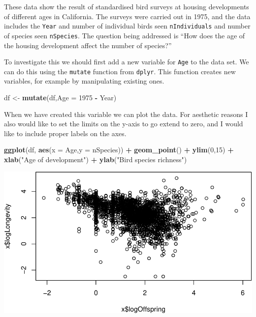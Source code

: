 \documentclass[
  a4paperpaper,
]{book}
\newenvironment{Shaded}{\begin{snugshade}}{\end{snugshade}}
\newcommand{\DataTypeTok}[1]{\textcolor[rgb]{0.13,0.29,0.53}{#1}}
\newcommand{\DecValTok}[1]{\textcolor[rgb]{0.00,0.00,0.81}{#1}}
\newcommand{\KeywordTok}[1]{\textcolor[rgb]{0.13,0.29,0.53}{\textbf{#1}}}
\newcommand{\NormalTok}[1]{#1}
\newcommand{\OperatorTok}[1]{\textcolor[rgb]{0.81,0.36,0.00}{\textbf{#1}}}
\newcommand{\StringTok}[1]{\textcolor[rgb]{0.31,0.60,0.02}{#1}}
\begin{document}
These data show the result of standardised bird surveys at housing developments of different ages in California. The surveys were carried out in 1975, and the data includes the \texttt{Year} and number of individual birds seen \texttt{nIndividuals} and number of species seen \texttt{nSpecies}. The question being addressed is ``How does the age of the housing development affect the number of species?''

To investigate this we should first add a new variable for \texttt{Age} to the data set. We can do this using the \texttt{mutate} function from \texttt{dplyr}. This function creates new variables, for example by manipulating existing ones.

\begin{Shaded}
\begin{Highlighting}[]
\NormalTok{df \textless{}{-}}\StringTok{ }\KeywordTok{mutate}\NormalTok{(df,}\DataTypeTok{Age =} \DecValTok{1975} \OperatorTok{{-}}\StringTok{ }\NormalTok{Year)}
\end{Highlighting}
\end{Shaded}

When we have created this variable we can plot the data. For aesthetic reasons I also would like to set the limits on the y-axis to go extend to zero, and I would like to include proper labels on the axes.

\begin{Shaded}
\begin{Highlighting}[]
\KeywordTok{ggplot}\NormalTok{(df, }\KeywordTok{aes}\NormalTok{(}\DataTypeTok{x =}\NormalTok{ Age,}\DataTypeTok{y =}\NormalTok{ nSpecies)) }\OperatorTok{+}\StringTok{ }
\StringTok{  }\KeywordTok{geom\_point}\NormalTok{() }\OperatorTok{+}\StringTok{ }
\StringTok{  }\KeywordTok{ylim}\NormalTok{(}\DecValTok{0}\NormalTok{,}\DecValTok{15}\NormalTok{) }\OperatorTok{+}\StringTok{ }
\StringTok{  }\KeywordTok{xlab}\NormalTok{(}\StringTok{"Age of development"}\NormalTok{) }\OperatorTok{+}\StringTok{ }\KeywordTok{ylab}\NormalTok{(}\StringTok{"Bird species richness"}\NormalTok{)}
\end{Highlighting}
\end{Shaded}

\includegraphics{BB852_files/figure-latex/unnamed-chunk-89-1.pdf}
\end{document}
